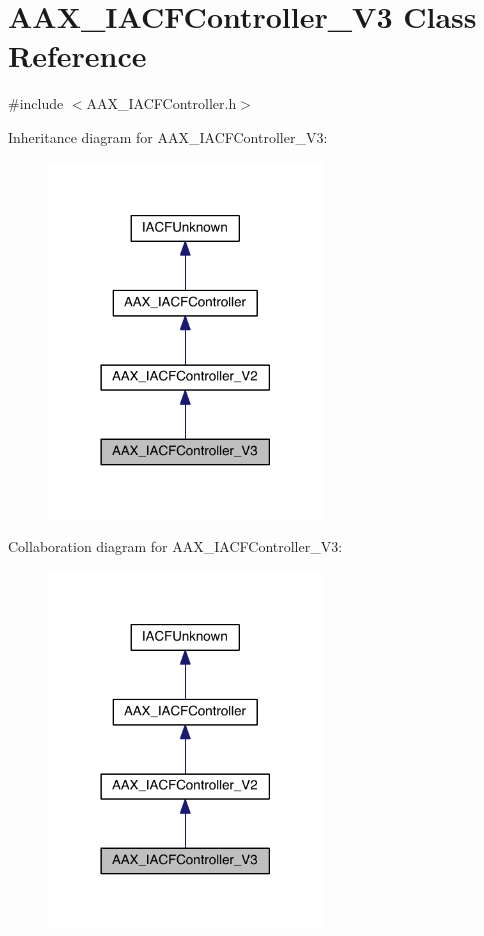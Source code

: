 \hypertarget{a00055}{}\section{A\+A\+X\+\_\+\+I\+A\+C\+F\+Controller\+\_\+\+V3 Class Reference}
\label{a00055}


{\ttfamily \#include $<$A\+A\+X\+\_\+\+I\+A\+C\+F\+Controller.\+h$>$}



Inheritance diagram for A\+A\+X\+\_\+\+I\+A\+C\+F\+Controller\+\_\+\+V3\+:
\nopagebreak
\begin{figure}[H]
\begin{center}
\leavevmode
\includegraphics[width=206pt]{a00508}
\end{center}
\end{figure}


Collaboration diagram for A\+A\+X\+\_\+\+I\+A\+C\+F\+Controller\+\_\+\+V3\+:
\nopagebreak
\begin{figure}[H]
\begin{center}
\leavevmode
\includegraphics[width=206pt]{a00509}
\end{center}
\end{figure}


